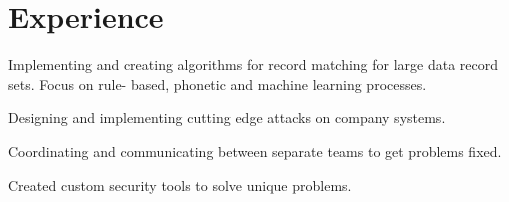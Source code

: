 \documentclass[letterpaper]{deedy-resume} %
\begin{document}



\begin{minipage}[t]{0.66\textwidth} %



\section{Experience}


\vspace{\topsep} %
\begin{tightitemize}
\item Implementing and creating algorithms for record matching for large data record sets. Focus on rule- based, phonetic and machine learning processes.
\end{tightitemize}

\sectionspace %



\begin{tightitemize}
\item Designing and implementing cutting edge attacks on company systems.
\item Coordinating and communicating between separate teams to get problems fixed.
\item Created custom security tools to solve unique problems. 
\end{tightitemize}


\end{minipage}
\end{document}
